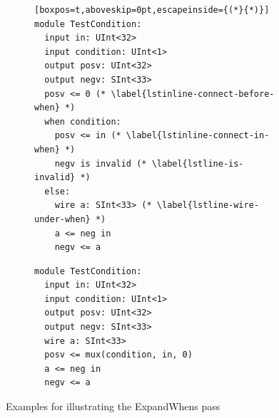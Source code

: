 \begin{figure}[h]
\vspace{-2mm}
\centering
\begin{subfigure}[b]{0.4\textwidth}
         \centering
\begin{lstlisting}[boxpos=t,aboveskip=0pt,escapeinside={(*}{*)}]
module TestCondition:
  input in: UInt<32>
  input condition: UInt<1>
  output posv: UInt<32>
  output negv: SInt<33>
  posv <= 0 (* \label{lstinline-connect-before-when} *)
  when condition:
    posv <= in (* \label{lstinline-connect-in-when} *)
    negv is invalid (* \label{lstline-is-invalid} *)
  else:
    wire a: SInt<33> (* \label{lstline-wire-under-when} *)
    a <= neg in
    negv <= a
\end{lstlisting}
\vspace*{0.92\baselineskip}
\caption{}
\end{subfigure}
\hspace{4mm}
\begin{subfigure}[b]{0.4\textwidth}
         \centering
\begin{lstlisting}[boxpos=t,aboveskip=0pt]
module TestCondition:
  input in: UInt<32>
  input condition: UInt<1>
  output posv: UInt<32>
  output negv: SInt<33>
  wire a: SInt<33>
  posv <= mux(condition, in, 0)
  a <= neg in
  negv <= a 
\end{lstlisting}
\caption{}
\end{subfigure}
\vspace{-2mm}
\caption{Examples for illustrating the ExpandWhens pass}
\label{fig-lofirrtl-exmp3}
\vspace{-2mm}
\end{figure}
%

